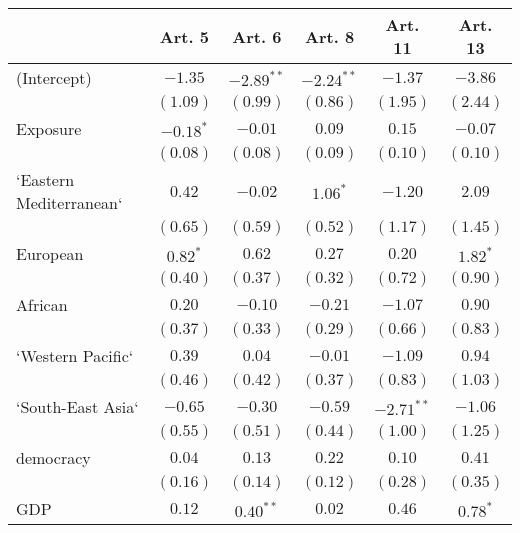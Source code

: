 
\begin{table}[!h]
\begin{center}
\begin{tabular}{l c c c c c }
\toprule
 & Art. 5 & Art. 6 & Art. 8 & Art. 11 & Art. 13 \\
\midrule
(Intercept)             & $-1.35$      & $-2.89^{**}$ & $-2.24^{**}$ & $-1.37$      & $-3.86$      \\
                        & $(1.09)$     & $(0.99)$     & $(0.86)$     & $(1.95)$     & $(2.44)$     \\
Exposure                & $-0.18^{*}$  & $-0.01$      & $0.09$       & $0.15$       & $-0.07$      \\
                        & $(0.08)$     & $(0.08)$     & $(0.09)$     & $(0.10)$     & $(0.10)$     \\
`Eastern Mediterranean` & $0.42$       & $-0.02$      & $1.06^{*}$   & $-1.20$      & $2.09$       \\
                        & $(0.65)$     & $(0.59)$     & $(0.52)$     & $(1.17)$     & $(1.45)$     \\
European                & $0.82^{*}$   & $0.62$       & $0.27$       & $0.20$       & $1.82^{*}$   \\
                        & $(0.40)$     & $(0.37)$     & $(0.32)$     & $(0.72)$     & $(0.90)$     \\
African                 & $0.20$       & $-0.10$      & $-0.21$      & $-1.07$      & $0.90$       \\
                        & $(0.37)$     & $(0.33)$     & $(0.29)$     & $(0.66)$     & $(0.83)$     \\
`Western Pacific`       & $0.39$       & $0.04$       & $-0.01$      & $-1.09$      & $0.94$       \\
                        & $(0.46)$     & $(0.42)$     & $(0.37)$     & $(0.83)$     & $(1.03)$     \\
`South-East Asia`       & $-0.65$      & $-0.30$      & $-0.59$      & $-2.71^{**}$ & $-1.06$      \\
                        & $(0.55)$     & $(0.51)$     & $(0.44)$     & $(1.00)$     & $(1.25)$     \\
democracy               & $0.04$       & $0.13$       & $0.22$       & $0.10$       & $0.41$       \\
                        & $(0.16)$     & $(0.14)$     & $(0.12)$     & $(0.28)$     & $(0.35)$     \\
GDP                     & $0.12$       & $0.40^{**}$  & $0.02$       & $0.46$       & $0.78^{*}$   \\

\end{tabular}
\end{center}
\end{table}
